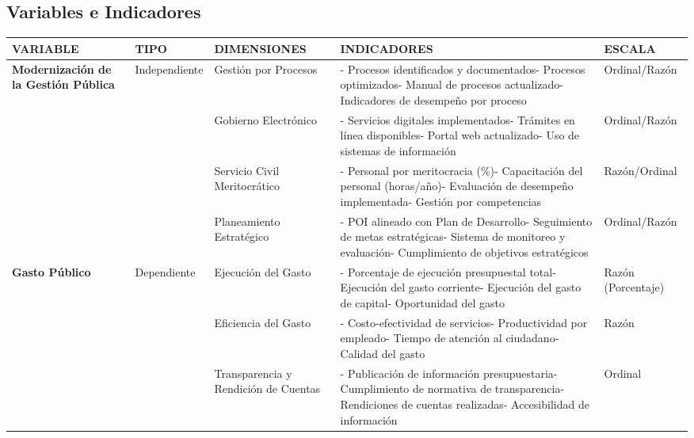 \documentclass[
  man,
  floatsintext,
  longtable,
  a4paper,
  nolmodern,
  notxfonts,
  notimes,
  12pt,
  colorlinks=true,linkcolor=blue,citecolor=blue,urlcolor=blue]{apa7}
\newcounter{none} %
\begin{document}
\subsection{Variables e Indicadores}\label{variables-e-indicadores-8}

{\def\LTcaptype{none} %
\begin{longtable}[]{@{}
  >{\raggedright\arraybackslash}p{}
  >{\raggedright\arraybackslash}p{}
  >{\raggedright\arraybackslash}p{}
  >{\raggedright\arraybackslash}p{}
  >{\raggedright\arraybackslash}p{}@{}}
\toprule\noalign{}
\begin{minipage}[b]{\linewidth}\raggedright
VARIABLE
\end{minipage} & \begin{minipage}[b]{\linewidth}\raggedright
TIPO
\end{minipage} & \begin{minipage}[b]{\linewidth}\raggedright
DIMENSIONES
\end{minipage} & \begin{minipage}[b]{\linewidth}\raggedright
INDICADORES
\end{minipage} & \begin{minipage}[b]{\linewidth}\raggedright
ESCALA
\end{minipage} \\
\midrule\noalign{}
\endhead
\bottomrule\noalign{}
\endlastfoot
\textbf{Modernización de la Gestión Pública} & Independiente & Gestión
por Procesos & - Procesos identificados y documentados- Procesos
optimizados- Manual de procesos actualizado- Indicadores de desempeño
por proceso & Ordinal/Razón \\
& & Gobierno Electrónico & - Servicios digitales implementados- Trámites
en línea disponibles- Portal web actualizado- Uso de sistemas de
información & Ordinal/Razón \\
& & Servicio Civil Meritocrático & - Personal por meritocracia (\%)-
Capacitación del personal (horas/año)- Evaluación de desempeño
implementada- Gestión por competencias & Razón/Ordinal \\
& & Planeamiento Estratégico & - POI alineado con Plan de Desarrollo-
Seguimiento de metas estratégicas- Sistema de monitoreo y evaluación-
Cumplimiento de objetivos estratégicos & Ordinal/Razón \\
\textbf{Gasto Público} & Dependiente & Ejecución del Gasto & -
Porcentaje de ejecución presupuestal total- Ejecución del gasto
corriente- Ejecución del gasto de capital- Oportunidad del gasto & Razón
(Porcentaje) \\
& & Eficiencia del Gasto & - Costo-efectividad de servicios-
Productividad por empleado- Tiempo de atención al ciudadano- Calidad del
gasto & Razón \\
& & Transparencia y Rendición de Cuentas & - Publicación de información
presupuestaria- Cumplimiento de normativa de transparencia- Rendiciones
de cuentas realizadas- Accesibilidad de información & Ordinal \\
\end{longtable}
}
\end{document}
